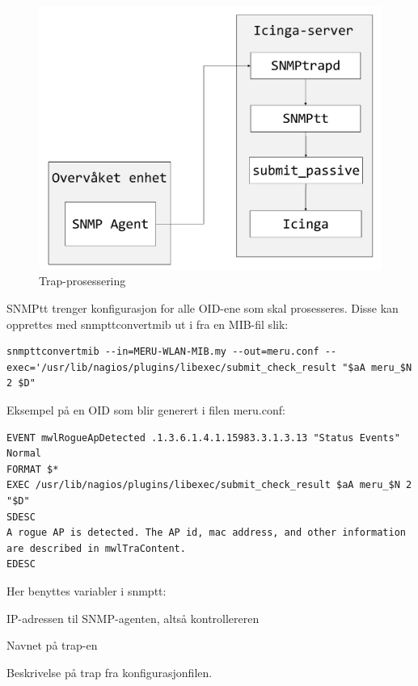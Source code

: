\begin{figure}[H]
    \centering
    \includegraphics[scale=0.4]{img/SNMPtrap}
    \caption{Trap-prosessering}
    \label{snmptrap}
\end{figure}

SNMPtt trenger konfigurasjon for alle OID-ene som skal prosesseres. Disse kan opprettes med snmpttconvertmib ut i fra en MIB-fil slik:
\begin{lstlisting}[style=example]
snmpttconvertmib --in=MERU-WLAN-MIB.my --out=meru.conf --exec='/usr/lib/nagios/plugins/libexec/submit_check_result "$aA meru_$N 2 $D"
\end{lstlisting}

Eksempel på en OID som blir generert i filen meru.conf:
\begin{lstlisting}[style=example]
EVENT mwlRogueApDetected .1.3.6.1.4.1.15983.3.1.3.13 "Status Events" Normal
FORMAT $*
EXEC /usr/lib/nagios/plugins/libexec/submit_check_result $aA meru_$N 2 "$D"
SDESC
A rogue AP is detected. The AP id, mac address, and other information are described in mwlTraContent.
EDESC
\end{lstlisting}

Her benyttes variabler i snmptt\cite{snmptrans}:
\begin{itemize*}
	\item IP-adressen til SNMP-agenten, altså kontrollereren
	\item Navnet på trap-en
	\item Beskrivelse på trap fra konfigurasjonfilen.
\end{itemize*}

